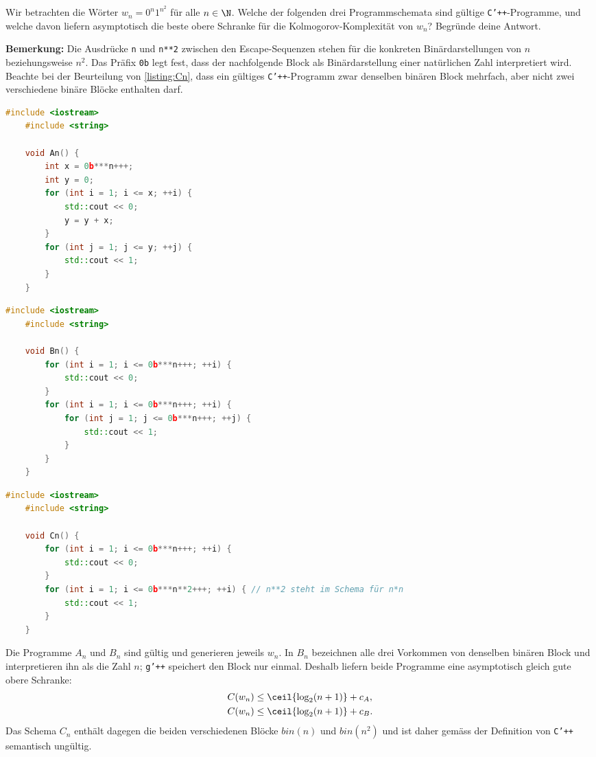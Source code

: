 \begin{questions}
	\question[2] Wir betrachten die Wörter $w_n = 0^n1^{n^2}$ für alle $n\in\N$. Welche der folgenden drei Programmschemata sind gültige \texttt{C'++}-Programme, und welche davon liefern asymptotisch die beste obere Schranke für die Kolmogorov-Komplexität von $w_n$? Begründe deine Antwort.

	\textbf{Bemerkung:} Die Ausdrücke \verb|n| und \verb|n**2| zwischen den Escape-Sequenzen stehen für die konkreten Binärdarstellungen von $n$ beziehungsweise $n^2$. Das Präfix \verb|0b| legt fest, dass der nachfolgende Block als Binärdarstellung einer natürlichen Zahl interpretiert wird. Beachte bei der Beurteilung von \cref{listing:Cn}, dass ein gültiges \texttt{C'++}-Programm zwar denselben binären Block mehrfach, aber nicht zwei verschiedene binäre Blöcke enthalten darf.
\begin{lstlisting}[language=C++,caption=$A_n$]
    #include <iostream>
    #include <string>
    
    void An() {
        int x = 0b***n+++;
        int y = 0;
        for (int i = 1; i <= x; ++i) {
            std::cout << 0;
            y = y + x;
        }
        for (int j = 1; j <= y; ++j) {
            std::cout << 1;
        }
    }
\end{lstlisting}

\begin{lstlisting}[language=C++,caption=$B_n$]
    #include <iostream>
    #include <string>
    
    void Bn() {
        for (int i = 1; i <= 0b***n+++; ++i) {
            std::cout << 0;
        }
        for (int i = 1; i <= 0b***n+++; ++i) {
            for (int j = 1; j <= 0b***n+++; ++j) {
                std::cout << 1;
            }
        }
    }
\end{lstlisting}

\begin{lstlisting}[language=C++,caption=$C_n$,label=listing:Cn]
    #include <iostream>
    #include <string>
    
    void Cn() {
        for (int i = 1; i <= 0b***n+++; ++i) {
            std::cout << 0;
        }
        for (int i = 1; i <= 0b***n**2+++; ++i) { // n**2 steht im Schema für n*n
            std::cout << 1;
        }
    }
\end{lstlisting}
	\begin{solution}
		Die Programme $A_n$ und $B_n$ sind gültig und generieren jeweils $w_n$. In $B_n$ bezeichnen alle drei Vorkommen von  denselben binären Block und interpretieren ihn als die Zahl $n$; \texttt{g'++} speichert den Block nur einmal. Deshalb liefern beide Programme eine asymptotisch gleich gute obere Schranke:
		\begin{align*}
			C(w_n) &\leq \ceil{\log_2(n+1)} + c_A,\\
			C(w_n) &\leq \ceil{\log_2(n+1)} + c_B.
		\end{align*}
		Das Schema $C_n$ enthält dagegen die beiden verschiedenen Blöcke $bin(n)$ und $bin(n^2)$ und ist daher gemäss der Definition von \texttt{C'++} semantisch ungültig.
	\end{solution}



\end{questions}
